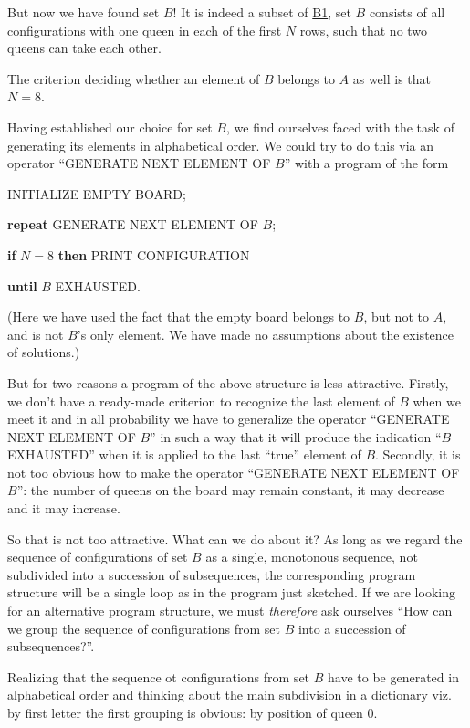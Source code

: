 But now we have found set $B$! It is indeed a subset of \hyperref[en:b1-eight-queens]{B1}, set $B$ consists of all configurations with one queen in each of the first $N$ rows, such that no two queens can take each other.

The criterion deciding whether an element of $B$ belongs to $A$ as well is that $N = 8$.

Having established our choice for set $B$, we find ourselves faced with the task of generating its elements in alphabetical order. We could try to do this via an operator ``GENERATE NEXT ELEMENT OF $B$'' with a program of the form

INITIALIZE EMPTY BOARD;

\textbf{\textbf{repeat}} GENERATE NEXT ELEMENT OF $B$;

\quad \textbf{if} $N = 8$ \textbf{then} PRINT CONFIGURATION

\textbf{until} $B$ EXHAUSTED.

\noindent
(Here we have used the fact that the empty board belongs to $B$, but not to $A$, and is not $B$'s only element. We have made no assumptions about the existence of solutions.)

But for two reasons a program of the above structure is less attractive. Firstly, we don't have a ready-made criterion to recognize the last element of $B$ when we meet it and in all probability we have to generalize the operator ``GENERATE NEXT ELEMENT OF $B$'' in such a way that it will produce the indication ``$B$ EXHAUSTED'' when it is applied to the last ``true'' element of $B$. Secondly, it is not too obvious how to make the operator ``GENERATE NEXT ELEMENT OF $B$'': the number of queens on the board may remain constant, it may decrease and it may increase.

So that is not too attractive. What can we do about it? As long as we regard the sequence of configurations of set $B$ as a single, monotonous sequence, not subdivided into a succession of subsequences, the corresponding program structure will be a single loop as in the program just sketched. If we are looking for an alternative program structure, we must \textit{therefore} ask ourselves ``How can we group the sequence of configurations from set $B$ into a succession of subsequences?''.

Realizing that the sequence ot configurations from set $B$ have to be generated in alphabetical order and thinking about the main subdivision in a dictionary \textemdash{}  viz. by first letter \textemdash{}  the first grouping is obvious: by position of queen 0.

